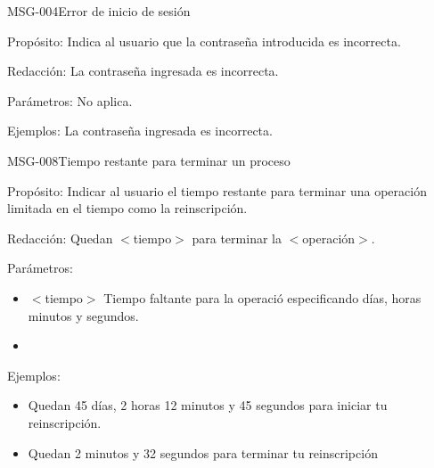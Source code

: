 \begin{cdtMessage}[msgErrorColor]{MSG-004}{Error de inicio de sesión}
	\item[Propósito:] Indica al usuario que la contraseña introducida es incorrecta.
	\item[Redacción:] La contraseña ingresada es incorrecta.
	\item[Parámetros:] No aplica.
	\item[Ejemplos:] La contraseña ingresada es incorrecta.
\end{cdtMessage}

\begin{cdtMessage}{MSG-008}{Tiempo restante para terminar un proceso} 
	\item[Propósito:] Indicar al usuario el tiempo restante para terminar una operación limitada en el tiempo como la reinscripción.
	\item[Redacción:] Quedan $<$tiempo$>$ para terminar la $<$operación$>$.
	\item[Parámetros:] \hspace{1cm}
	\begin{itemize}
		\item $<$tiempo$>$ Tiempo faltante para la operació especificando días, horas minutos y segundos.
		\item 
	\end{itemize}
	\item[Ejemplos:] \hspace{1cm}
	\begin{itemize}
		\item Quedan 45 días, 2 horas 12 minutos y 45 segundos para iniciar tu reinscripción.
		\item Quedan 2 minutos y 32 segundos para terminar tu reinscripción
	\end{itemize}
\end{cdtMessage}

